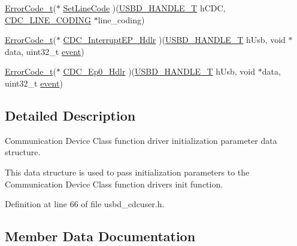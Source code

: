 \begin{DoxyCompactItemize}
\item 
\hyperlink{error_8h_a905255056c349318139d94aa4523d516}{Error\+Code\+\_\+t}($\ast$ \hyperlink{struct_u_s_b_d___c_d_c___i_n_i_t___p_a_r_a_m_aa2572724619feddd267d35ab6014f379}{Set\+Line\+Code} )(\hyperlink{group___u_s_b_d___core_gafdbb2204d929cb9d75736bd2b42342ac}{U\+S\+B\+D\+\_\+\+H\+A\+N\+D\+L\+E\+\_\+T} h\+C\+DC, \hyperlink{usbd__cdc_8h_a1d66ffafad206be2563c72cb972fbf52}{C\+D\+C\+\_\+\+L\+I\+N\+E\+\_\+\+C\+O\+D\+I\+NG} $\ast$line\+\_\+coding)
\item 
\hyperlink{error_8h_a905255056c349318139d94aa4523d516}{Error\+Code\+\_\+t}($\ast$ \hyperlink{struct_u_s_b_d___c_d_c___i_n_i_t___p_a_r_a_m_ada9ad64d565d5ca5ebb6bc0636b9882e}{C\+D\+C\+\_\+\+Interrupt\+E\+P\+\_\+\+Hdlr} )(\hyperlink{group___u_s_b_d___core_gafdbb2204d929cb9d75736bd2b42342ac}{U\+S\+B\+D\+\_\+\+H\+A\+N\+D\+L\+E\+\_\+T} h\+Usb, void $\ast$data, uint32\+\_\+t \hyperlink{structevent}{event})
\item 
\hyperlink{error_8h_a905255056c349318139d94aa4523d516}{Error\+Code\+\_\+t}($\ast$ \hyperlink{struct_u_s_b_d___c_d_c___i_n_i_t___p_a_r_a_m_aa537c123e85c8e402a24fd593ca1d4d7}{C\+D\+C\+\_\+\+Ep0\+\_\+\+Hdlr} )(\hyperlink{group___u_s_b_d___core_gafdbb2204d929cb9d75736bd2b42342ac}{U\+S\+B\+D\+\_\+\+H\+A\+N\+D\+L\+E\+\_\+T} h\+Usb, void $\ast$data, uint32\+\_\+t \hyperlink{structevent}{event})
\end{DoxyCompactItemize}


\subsection{Detailed Description}
Communication Device Class function driver initialization parameter data structure. 

This data structure is used to pass initialization parameters to the Communication Device Class function driver\textquotesingle{}s init function. 

Definition at line 66 of file usbd\+\_\+cdcuser.\+h.



\subsection{Member Data Documentation}
\mbox{\label{struct_u_s_b_d___c_d_c___i_n_i_t___p_a_r_a_m_ac6a85d108817d7ba7e56934df8c80b81}} 
